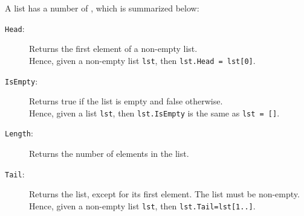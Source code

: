 \documentclass[fsharpNotes.tex]{subfiles}
\begin{document}
\newpage
A list has a number of , which is summarized below:
\begin{description}
\item[\texttt{Head}:] Returns the first element of a non-empty list.
  ~\\
  Hence, given a non-empty list \lstinline{lst}, then \lstinline{lst.Head = lst[0]}.
\item[\texttt{IsEmpty}:] Returns true if the list is empty and false otherwise.
  ~\\
  Hence, given a list \lstinline{lst}, then \lstinline{lst.IsEmpty} is the same as \lstinline{lst = []}.
\item[\texttt{Length}:] Returns the number of elements in the list.
  ~\\
\item[\texttt{Tail}:] Returns the list, except for its first element. The list must be non-empty.
  ~\\
  Hence, given a non-empty list \lstinline{lst}, then \lstinline{lst.Tail=lst[1..]}.
\end{description}

\end{document}
